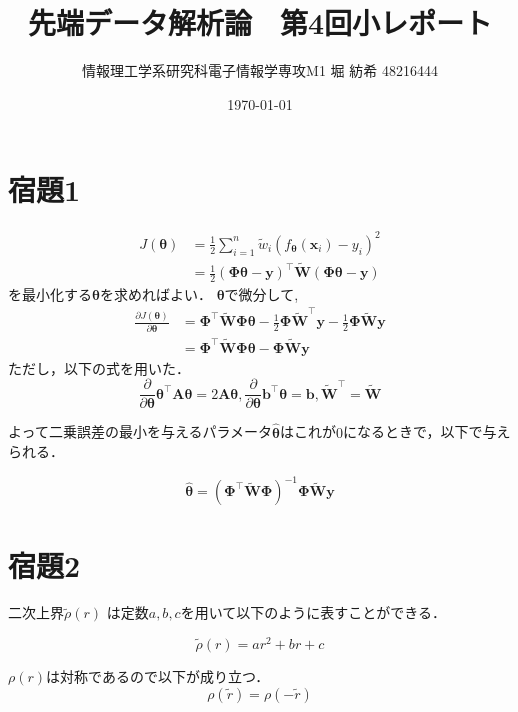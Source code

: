 \documentclass[a4paper,11pt]{jsarticle}
\begin{document}
  \title{先端データ解析論　第4回小レポート}
  \author{情報理工学系研究科電子情報学専攻M1 堀 紡希 48216444}
  \date{\today}
  \maketitle

  \section*{宿題1}
  \begin{align*}
    J({\bm \theta}) &= \frac{1}{2} \sum _{i=1} ^n \widetilde{w}_i \left(f_{\bm \theta} ({\bm x}_i) -y_i\right)^2 \\
    &= \frac{1}{2} ({\bm \Phi } {\bm \theta} - {\bm y} )^{\top} \widetilde{{\bm W}} ({\bm \Phi } {\bm \theta} - {\bm y} )
  \end{align*}
  を最小化する${\bm \theta}$を求めればよい．
  ${\bm \theta}$で微分して, 
  \begin{align*}
    \frac{\partial J({\bm \theta})}{\partial {\bm \theta}} &= {\bm \Phi}^\top \widetilde{\bm W} {\bm \Phi} {\bm \theta} - \frac{1}{2}{\bm \Phi} \widetilde{\bm W}^\top {\bm y} - \frac{1}{2}{\bm \Phi} \widetilde{\bm W} {\bm y}\\
    &= {\bm \Phi}^\top \widetilde{\bm W} {\bm \Phi} {\bm \theta} - {\bm \Phi} \widetilde{\bm W} {\bm y}
  \end{align*}
  ただし，以下の式を用いた．
  \[ \frac{\partial}{\partial {\bm \theta}} {\bm \theta}^\top {\bm A} {\bm \theta} = 2{\bm A} {\bm \theta}, \frac{\partial}{\partial {\bm \theta}} {\bm b}^\top {\bm \theta} = {\bm b}, \widetilde{\bm W}^\top = \widetilde{\bm W} \]

  よって二乗誤差の最小を与えるパラメータ$\hat{\bm \theta}$はこれが$0$になるときで，以下で与えられる．

  \[ \hat{\bm \theta} = ( {\bm \Phi}^\top \widetilde{\bm W} {\bm \Phi} )^{-1} {\bm \Phi} \widetilde{\bm W} {\bm y}\]
  
  \section*{宿題2}

  二次上界$\widetilde{\rho} (r) $ は定数$a, b, c$を用いて以下のように表すことができる．

  \[ \widetilde{\rho} (r) = ar^2 + br + c \]

  $\rho (r)$は対称であるので以下が成り立つ．
  \[ \rho (\widetilde{r}) =  \rho (-\widetilde{r})\]
\end{document}

